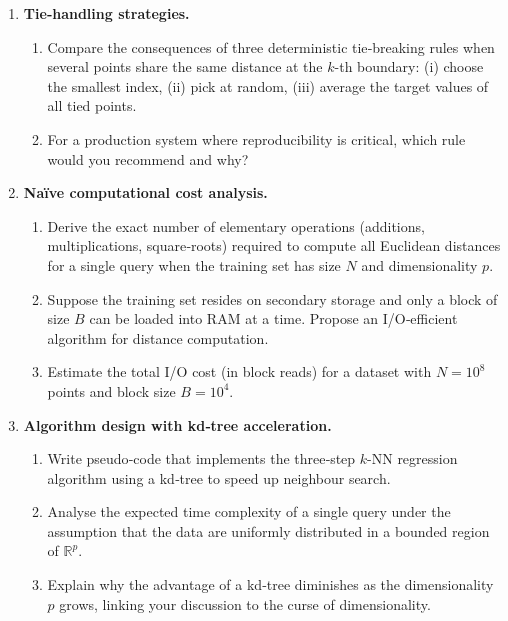 \documentclass[12pt, a4paper]{article}
\begin{document}
\begin{enumerate}
    \item \textbf{Tie‑handling strategies.}
    \begin{enumerate}
        \item Compare the consequences of three deterministic tie‑breaking rules when several points share the same distance at the \(k\)-th boundary: (i) choose the smallest index, (ii) pick at random, (iii) average the target values of all tied points.
        \item For a production system where reproducibility is critical, which rule would you recommend and why?
    \end{enumerate}
    
    \item \textbf{Naïve computational cost analysis.}
    \begin{enumerate}
        \item Derive the exact number of elementary operations (additions, multiplications, square‑roots) required to compute all Euclidean distances for a single query when the training set has size \(N\) and dimensionality \(p\).
        \item Suppose the training set resides on secondary storage and only a block of size \(B\) can be loaded into RAM at a time. Propose an I/O‑efficient algorithm for distance computation.
        \item Estimate the total I/O cost (in block reads) for a dataset with \(N=10^{8}\) points and block size \(B=10^{4}\).
    \end{enumerate}
    
    \item \textbf{Algorithm design with kd‑tree acceleration.}
    \begin{enumerate}
        \item Write pseudo‑code that implements the three‑step \(k\)-NN regression algorithm using a kd‑tree to speed up neighbour search.
        \item Analyse the expected time complexity of a single query under the assumption that the data are uniformly distributed in a bounded region of \(\mathbb{R}^{p}\).
        \item Explain why the advantage of a kd‑tree diminishes as the dimensionality \(p\) grows, linking your discussion to the curse of dimensionality.
    \end{enumerate}
    

\end{enumerate}
\end{document}

